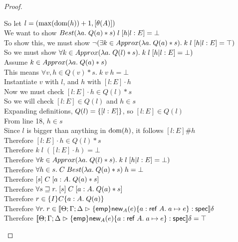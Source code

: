 \begin{proof}
\begin{tabbedproof}
    \oooooo So let $l = (\max(\mbox{dom}({h}))+1, [\theta(A)])$ \\
    \oooooo We want to show $Best(\lambda a.\;Q(a)*s)\;l\;[h|l:E] = \bot$ \\
    \oooooo To show this, we must show $\lnot (\exists k \in Approx(\lambda a.\;Q(a)*s).\;k\;l\;[h|l:E] = \top)$ \\
    \oooooo So we must show $\forall k \in Approx(\lambda a.\;Q(l)*s).\;k\;l\;[h|l:E] = \bot)$ \\
    \oooooo Assume $k \in Approx(\lambda a.\;Q(a)*s)$ \\
    \ooooooo This means $\forall v, h \in Q(v)*s.\; k\;v\;h = \bot$ \\
    \ooooooo Instantiate $v$ with $l$, and $h$ with $[l:E]\cdot h$ \\
    \ooooooo Now we must check $[l:E]\cdot h \in Q(l) * s$ \\
    \ooooooo So we will check $[l:E] \in Q(l)$ and $h \in s$ \\
    \ooooooo Expanding definitions, $Q(l) = \{{[l:E]}\}$, so $[l:E] \in Q(l)$ \\
    \ooooooo From line 18, $h \in s$ \\
    \ooooooo Since $l$ is bigger than anything in $\mbox{dom}({h})$, it follows $[l:E] \# h$ \\
    \ooooooo Therefore $[l:E]\cdot h \in Q(l) * s$ \\
    \ooooooo Therefore $k\;l\;([l:E]\cdot h) = \bot$ \\
    \oooooo Therefore $\forall k \in Approx(\lambda a.\;Q(l)*s).\;k\;l\;[h|l:E] = \bot)$ \\
    \ooooo Therefore $\forall h \in s.\; C\;Best(\lambda a.\;Q(a)*s)\;h = \bot$ \\
    \ooooo Therefore $[{s}]\;{C}\;[{a:A}.\;{Q(a)*s}]$ \\
    \oooo Therefore $\forall s \sqsupseteq r.\; [{s}]\;{C}\;[{a:A}.\;{Q(a)*s}]$ \\
    \oooo Therefore $r \in \{{I}\}{C}\{{a:A}.\;{Q(a)}\}$ \\
    \ooo Therefore $\forall r.\; r \in [\![{{\Theta; \Gamma; \Delta} \vartriangleright {\{{\mathsf{emp}}\}{\mathsf{new}_{A}(e)}\{{a:\mathsf{ref}\;A}.\;{a \mapsto e}\}} : \mathsf{spec}}]\!]\delta$ \\
    \ooo Therefore $[\![{{\Theta; \Gamma; \Delta} \vartriangleright {\{{\mathsf{emp}}\}{\mathsf{new}_{A}(e)}\{{a:\mathsf{ref}\;A}.\;{a \mapsto e}\}} : \mathsf{spec}}]\!]\delta = \top$ \\
  \end{tabbedproof}
\end{proof}

